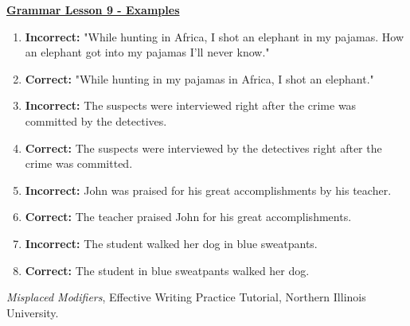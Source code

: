\documentclass[12pt]{article} %
\begin{document}
\begin{center}
  \textbf{\underline{\Huge{Grammar Lesson 9 - Examples}}}
\end{center}
\begin{enumerate}
  \item \textbf{Incorrect:} "While hunting in Africa, I shot an elephant in my pajamas. How an elephant got into my pajamas
  I'll never know."\\
  \item \textbf{Correct:} "While hunting in my pajamas in Africa, I shot an elephant."\\
  \item \textbf{Incorrect:} The suspects were interviewed right after the crime was committed by the detectives.\\
  \item \textbf{Correct: }The suspects were interviewed by the detectives right after the crime was committed.\\
  \item \textbf{Incorrect:} John was praised for his great accomplishments by his teacher.\\
  \item \textbf{Correct:} The teacher praised John for his great accomplishments.\\
  \item \textbf{Incorrect:} The student walked her dog in blue sweatpants.\\
  \item \textbf{Correct:} The student in blue sweatpants walked her dog.
\end{enumerate}





  

  


\vspace*{21cm}


\textit{Misplaced Modifiers}, Effective Writing Practice Tutorial, Northern Illinois University.\\
\end{document}
